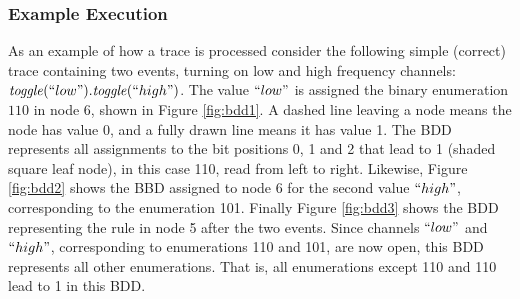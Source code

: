 \subsubsection{Example Execution}

As an example of how a trace is processed consider the following simple (correct) trace containing two events, turning on low and high frequency channels:
$\mathit{toggle}(``low").\mathit{toggle}(``high")$. The value $``low"$ is assigned the binary enumeration $110$ in node 6, shown in Figure \ref{fig:bdd1}. A dashed line leaving a node means the node has value 0, and a fully drawn line means it has value 1. The BDD represents all assignments to the bit positions 0, 1 and 2 that lead to 1 (shaded square leaf node), in this case 110, read from left to right. Likewise, Figure \ref{fig:bdd2} shows the BBD assigned to node 6 for the second value $``high"$, corresponding to the enumeration 101. Finally Figure \ref{fig:bdd3} shows the BDD representing the rule  in node 5 after the two events. Since channels $``low"$ and $``high"$, corresponding to enumerations 110 and 101, are now open, this BDD represents all other enumerations. That is, all enumerations except 110 and 110 lead to 1 in this BDD.

